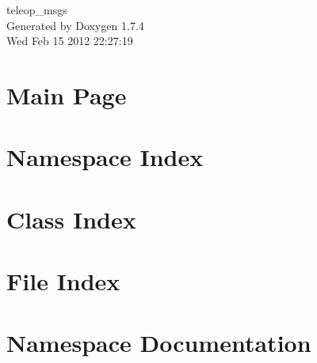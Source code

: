 \documentclass[a4paper]{book}
\begin{document}
\begin{titlepage}
\vspace*{7cm}
\begin{center}
{\Large teleop\_\-msgs }\\
\vspace*{1cm}
{\large Generated by Doxygen 1.7.4}\\
\vspace*{0.5cm}
{\small Wed Feb 15 2012 22:27:19}\\
\end{center}
\end{titlepage}
\clearemptydoublepage
{}
\tableofcontents
\clearemptydoublepage
{}
\chapter{Main Page}
\label{index}
\chapter{Namespace Index}

\chapter{Class Index}

\chapter{File Index}

\chapter{Namespace Documentation}









\end{document}

